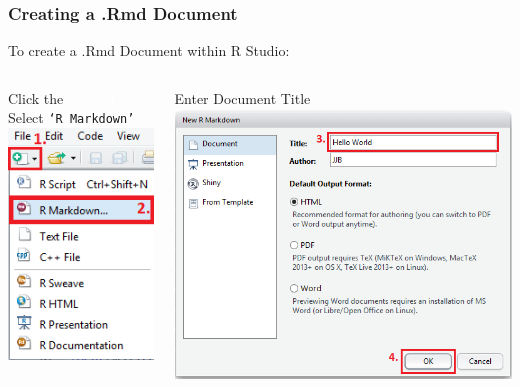 \documentclass{beamer}\usepackage[]{graphicx}\usepackage[]{color}
\begin{document}
\begin{frame}
\frametitle{Creating a .Rmd Document}
To create a .Rmd Document within R Studio:

\begin{columns}[t]
\centering
\begin{block}{Click the \textcolor{white}{White Plus} \\  Select \texttt{`R Markdown'}}
\centering
\includegraphics[scale=0.5]{img/rmd/file_new_rmd.png}
\end{block}
\centering
\begin{block}{Enter Document Title}
\centering
\includegraphics[scale=0.35]{img/rmd/select_new_rmd.png}
\end{block}
\end{columns}
$ $\\
\end{frame}
\end{document}
